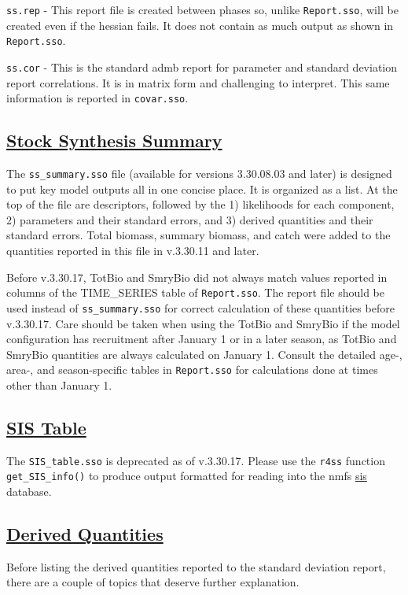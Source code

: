 \texttt{ss.rep} - This report file is created between phases so, unlike \texttt{Report.sso}, will be created even if the hessian fails. It does not contain as much output as shown in \texttt{Report.sso}.

\texttt{ss.cor} - This is the standard \gls{admb} report for parameter and standard deviation report correlations. It is in matrix form and challenging to interpret. This same information is reported in \texttt{covar.sso}.

\hypertarget{SS3Summary}{}
\subsection[Stock Synthesis Summary]{\protect\hyperlink{SS3Summary}{Stock Synthesis Summary}}
The \texttt{ss\_summary.sso} file (available for versions 3.30.08.03 and later) is designed to put key model outputs all in one concise place. It is organized as a list. At the top of the file are descriptors, followed by the 1) likelihoods for each component, 2) parameters and their standard errors, and 3) derived quantities and their standard errors. Total biomass, summary biomass, and catch were added to the quantities reported in this file in v.3.30.11 and later.

Before v.3.30.17, TotBio and SmryBio did not always match values reported in columns of the TIME\_SERIES table of \texttt{Report.sso}. The report file should be used instead of \texttt{ss\_summary.sso} for correct calculation of these quantities before v.3.30.17. Care should be taken when using the TotBio and SmryBio if the model configuration has recruitment after January 1 or in a later season, as TotBio and SmryBio quantities are always calculated on January 1. Consult the detailed age-, area-, and season-specific tables in \texttt{Report.sso} for calculations done at times other than January 1.

\hypertarget{SIStable}{}
\subsection[SIS Table]{\protect\hyperlink{SIStable}{SIS Table}}
The \texttt{SIS\_table.sso} is deprecated as of v.3.30.17. Please use the \texttt{r4ss} function \texttt{get\_SIS\_info()} to produce output formatted for reading into the \gls{nmfs} \href{https://www.st.nmfs.noaa.gov/sis/}{\gls{sis}} database.

\hypertarget{DerivedQuant}{}
\subsection[Derived Quantities]{\protect\hyperlink{DerivedQuant}{Derived Quantities}}
Before listing the derived quantities reported to the standard deviation report, there are a couple of topics that deserve further explanation.

